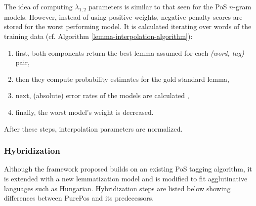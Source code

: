 The idea of computing $\lambda_{1,2}$ parameters is similar to that seen for the PoS $n$-gram models. 
However, instead of using positive weights, negative penalty scores are stored for the worst performing model.  
It is calculated iterating over words of the training data (cf. Algorithm \ref{lemma-interpolation-algorithm}):
\begin{enumerate}
  \item first, both components return the best lemma assumed for each \emph{(word, tag)} pair, 
  \item then they compute probability estimates for the gold standard lemma,
  \item next, (absolute) error rates of the models are calculated ,
  \item finally, the worst model’s weight is decreased.
\end{enumerate}
After these steps, interpolation parameters are normalized.


\subsubsection{Hybridization}

Although the framework proposed builds on an existing PoS tagging algorithm, it is extended with a new lemmatization model and is modified to fit agglutinative languages such as Hungarian. 
Hybridization steps are listed below showing differences between PurePos and its predecessors.

